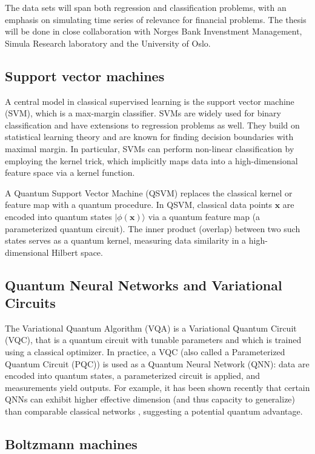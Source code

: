 \documentclass[%
oneside,                 %
final,                   %
10pt]{article}
\begin{document}
\noindent
The data sets will span both regression and classification problems,
with an emphasis on simulating time series of relevance for financial
problems. The thesis will be done in close collaboration with Norges
Bank Invenstment Management, Simula Research laboratory and the
University of Oslo.

\subsection{Support vector machines}

A central model in classical
supervised learning is the support vector machine (SVM), which is a
max-margin classifier.  SVMs are widely used for binary classification
and have extensions to regression problems as well.
They build on statistical learning
theory and are known for finding decision boundaries with maximal
margin.  In particular, SVMs can perform non-linear classification by
employing the kernel trick, which implicitly maps data into a
high-dimensional feature space via a kernel function.

A Quantum Support Vector Machine (QSVM) replaces the classical kernel
or feature map with a quantum procedure.  In QSVM, classical data
points $\bm{x}$ are encoded into quantum states
$|\phi(\bm{x})\rangle$ via a quantum feature map (a parameterized
quantum circuit).  The inner product (overlap) between two such states
serves as a quantum kernel, measuring data similarity in a
high-dimensional Hilbert space.

\subsection{Quantum Neural Networks and Variational Circuits}

The Variational Quantum Algorithm (VQA) is a 
Variational Quantum Circuit (VQC), that is  a quantum circuit with tunable
parameters and which is trained using a classical optimizer.  In practice, a
VQC (also called a Parameterized Quantum Circuit (PQC)) is used as a
Quantum Neural Network (QNN): data are encoded into quantum states, a
parameterized circuit is applied, and measurements yield outputs.
For example, it has been shown recently that certain QNNs can exhibit higher
effective dimension (and thus capacity to generalize) than comparable
classical networks , suggesting a potential quantum advantage.

\subsection{Boltzmann machines}
\end{document}
